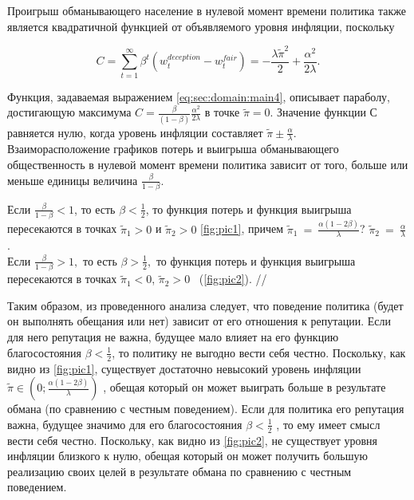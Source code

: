Проигрыш обманывающего население в нулевой момент времени политика также является квадратичной функцией от объявляемого уровня инфляции, поскольку

\begin{equation}
	\label{eq:sec:domain:main4}
C=\sum_{t=1}^{\infty} \beta^t(w^{deception}_t - w^{fair}_t) = -\frac{\lambda\tilde{\pi}^2}{2}+\frac{\alpha^2}{2\lambda}.
\end{equation}



Функция, задаваемая выражением \eqref{eq:sec:domain:main4}, описывает параболу, достигающую максимума $C=\frac{\beta}{(1-\beta)}\frac{\alpha^2}{2\lambda} $  в точке   $\tilde{\pi}=0$. Значение функции $С$ равняется нулю, когда уровень инфляции составляет $\tilde{\pi}\pm\frac{\alpha}{\lambda}$.
\\



Взаиморасположение графиков потерь и выигрыша обманывающего общественность в нулевой момент времени политика зависит от того, больше или меньше единицы величина $\frac{\beta}{1-\beta}$.

Если   $\frac{\beta}{1-\beta}<1$, то есть  $\beta<\frac{1}{2}$, то функция потерь и функция выигрыша пересекаются в точках  $\tilde{\pi}_1>0$ и $\tilde{\pi}_2>0$ \eqref{fig:pic1}, причем  $\tilde{\pi}_1~=~\frac{\alpha(1-2\beta)}{\lambda}$? $\tilde{\pi}_2~=~\frac{\alpha}{\lambda}$. \\
Если  $\frac{\beta}{1-\beta}>1,$  то есть  $\beta>\frac{1}{2},$  то функция потерь и функция выигрыша пересекаются в точках   $\tilde{\pi}_1<0$, $\tilde{\pi}_2>0$ ~(\ref{fig:pic2}).
//

Таким образом, из проведенного анализа следует, что поведение политика (будет он выполнять обещания или нет) зависит от его отношения к репутации. Если для него репутация не важна, будущее мало влияет на его функцию благосостояния $\beta<\frac{1}{2}$, то политику не выгодно вести себя честно. Поскольку, как видно из \eqref{fig:pic1}, существует достаточно невысокий уровень инфляции $\tilde{\pi}\in\left(0;\frac{\alpha(1-2\beta)}{\lambda} \right)$ , обещая который он может выиграть больше в результате обмана (по сравнению с честным поведением). Если для политика его репутация важна, будущее значимо для его благосостояния $\beta<\frac{1}{2}$ , то ему имеет смысл вести себя честно. Поскольку, как видно из \eqref{fig:pic2}, не существует уровня инфляции близкого к нулю, обещая который он может получить большую реализацию своих целей в результате обмана по сравнению с честным поведением.